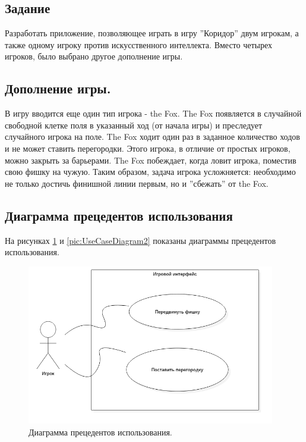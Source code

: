 \documentclass[a4paper]{article}
\begin{document}
\subsection{Задание}
Разработать приложение, позволяющее играть в игру ''Коридор'' двум игрокам, а также одному игроку против искусственного интеллекта. Вместо четырех игроков, было выбрано другое дополнение игры. 

\subsection{Дополнение игры.}
В игру вводится еще один тип игрока - the Fox. The Fox появляется в случайной свободной клетке поля в указанный ход (от начала игры) и преследует случайного игрока на поле. The Fox ходит один раз в заданное количество ходов и не может ставить перегородки. Этого игрока, в отличие от простых игроков, можно закрыть за барьерами. The Fox побеждает, когда ловит игрока, поместив свою фишку на чужую. Таким образом, задача игрока усложняется: необходимо не только достичь финишной линии первым, но и ''сбежать'' от the Fox.
\subsection{Диаграмма прецедентов использования}
На рисунках \ref{pic:UseCaseDiagram1} и \ref{pic:UseCaseDiagram2} показаны диаграммы прецедентов использования.
\begin{figure}[H]
	\begin{center}
		\includegraphics[scale=0.5, height=7cm]{../pictures/UseCaseDiagram1.png}
		\caption{Диаграмма прецедентов использования.} 
		\label{pic:UseCaseDiagram1} %
	\end{center}
\end{figure}
\end{document}
